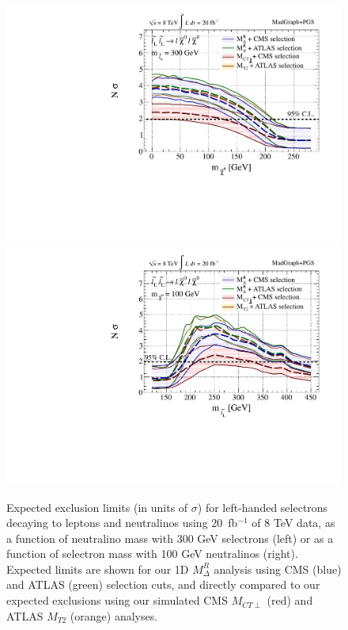 \begin{figure}[ht]
\includegraphics[width=0.4\columnwidth]{fig/sectionV/LIMIT1D_sleptonL_all_ML300.pdf}
\includegraphics[width=0.4\columnwidth]{fig/sectionV/LIMIT1D_sleptonL_all_MX100.pdf}
\caption{Expected exclusion limits (in units of $\sigma$) for left-handed selectrons decaying to leptons and neutralinos using 20~fb$^{-1}$ of 8 TeV data, as a function of neutralino mass with 300 GeV selectrons (left) or as a function of selectron mass with 100 GeV neutralinos (right). Expected limits are shown for our 1D $M_\Delta^R$ analysis using CMS (blue) and ATLAS (green) selection cuts, and directly compared to our expected exclusions using our simulated CMS $M_{CT\perp}$ (red) and ATLAS $M_{T2}$ (orange) analyses. \label{fig:results_1D_compare}}
\end{figure}

